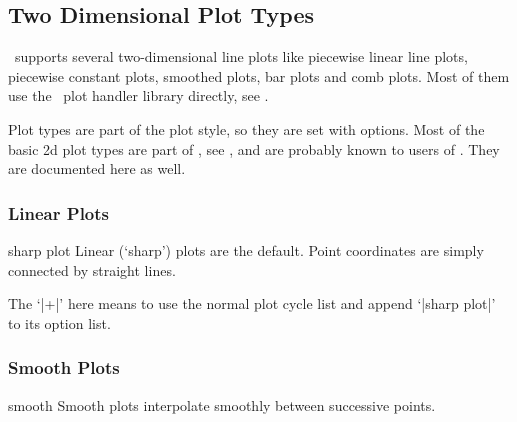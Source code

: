 
\subsection{Two Dimensional Plot Types}
{
%
\PGFPlots\ supports several two-dimensional line plots like piecewise linear line plots, piecewise constant plots, smoothed plots, bar plots and comb plots. Most of them use the \PGF\ plot handler library directly, see \cite[section 18.8]{tikz}.

Plot types are part of the plot style, so they are set with options. Most of the basic 2d plot types are part of \Tikz, see \cite[section 18.8]{tikz}, and are probably known to users of \Tikz. They are documented here as well.


\subsubsection{Linear Plots}
\begin{plottype}{sharp plot}
Linear (`sharp') plots are the default. Point coordinates are simply connected by straight lines. 
\begin{codeexample}[]
\end{codeexample}

The `|+|' here means to use the normal plot cycle list and append `|sharp plot|' to its option list.
\end{plottype}

\subsubsection{Smooth Plots}
\begin{plottype}{smooth}
Smooth plots interpolate smoothly between successive points.
\begin{codeexample}[]
\end{codeexample}
\end{plottype}

}
